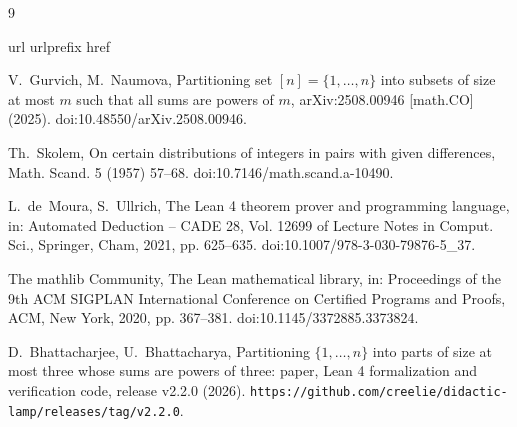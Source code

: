 \documentclass[preprint,12pt]{elsarticle}
\newcommand{\releaseURL}{https://github.com/creelie/didactic-lamp/releases/tag/v2.2.0}
\theoremstyle{definition}
\begin{document}
\begin{thebibliography}{9}
\raggedright
\expandafter\ifx\csname url\endcsname\relax
  \def\url#1{\texttt{#1}}\fi
\expandafter\ifx\csname urlprefix\endcsname\relax\def\urlprefix{URL }\fi
\expandafter\ifx\csname href\endcsname\relax
  \def\href#1#2{#2} \def\path#1{#1}\fi

V.~Gurvich, M.~Naumova, Partitioning set $[n]=\{1,\dots,n\}$ into subsets of size at most $m$ such that all sums are powers of $m$, arXiv:2508.00946 [math.CO] (2025).
\newblock \href {https://doi.org/10.48550/arXiv.2508.00946}
  {\path{doi:10.48550/arXiv.2508.00946}}.

Th.~Skolem, On certain distributions of integers in pairs with given differences, Math. Scand. 5 (1957) 57--68.
\newblock \href {https://doi.org/10.7146/math.scand.a-10490}
  {\path{doi:10.7146/math.scand.a-10490}}.

L.~de~Moura, S.~Ullrich, The {L}ean 4 theorem prover and programming language,
  in: Automated Deduction -- CADE 28, Vol. 12699 of Lecture Notes in Comput.
  Sci., Springer, Cham, 2021, pp. 625--635.
\newblock \href {https://doi.org/10.1007/978-3-030-79876-5_37}
  {\path{doi:10.1007/978-3-030-79876-5_37}}.

{The mathlib Community}, The {L}ean mathematical library, in: Proceedings of
  the 9th ACM SIGPLAN International Conference on Certified Programs and
  Proofs, ACM, New York, 2020, pp. 367--381.
\newblock \href {https://doi.org/10.1145/3372885.3373824}
  {\path{doi:10.1145/3372885.3373824}}.

D.~Bhattacharjee, U.~Bhattacharya, Partitioning $\{1,\dots,n\}$ into parts of size at most three whose sums are powers of three: paper, Lean 4 formalization and verification code, release v2.2.0 (2026).
\newblock \url{\releaseURL}.

\end{thebibliography}
\end{document}

